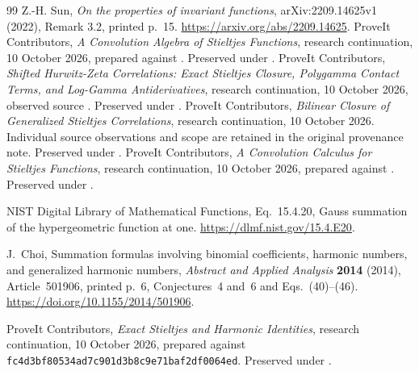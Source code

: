 \begin{thebibliography}{99}
Z.-H. Sun, \emph{On the properties of invariant functions},
arXiv:2209.14625v1 (2022), Remark 3.2, printed p.~15.
\url{https://arxiv.org/abs/2209.14625}.
ProveIt Contributors, \emph{A Convolution Algebra of Stieltjes Functions},
research continuation, 10 October 2026, prepared against .
Preserved under .
ProveIt Contributors, \emph{Shifted Hurwitz-Zeta Correlations:
Exact Stieltjes Closure, Polygamma Contact Terms, and Log-Gamma Antiderivatives},
research continuation, 10 October 2026, observed source .
Preserved under .
ProveIt Contributors, \emph{Bilinear Closure of Generalized Stieltjes Correlations},
research continuation, 10 October 2026. Individual source observations and
scope are retained in the original provenance note.
Preserved under .
ProveIt Contributors, \emph{A Convolution Calculus for Stieltjes Functions},
research continuation, 10 October 2026, prepared against .
Preserved under .

NIST Digital Library of Mathematical Functions, Eq.~15.4.20,
Gauss summation of the hypergeometric function at one.
\url{https://dlmf.nist.gov/15.4.E20}.

J.~Choi, Summation formulas involving binomial coefficients, harmonic
numbers, and generalized harmonic numbers, \emph{Abstract and Applied
Analysis} \textbf{2014} (2014), Article~501906, printed p.~6,
Conjectures~4 and~6 and Eqs.~(40)--(46).
\url{https://doi.org/10.1155/2014/501906}.

ProveIt Contributors, \emph{Exact Stieltjes and Harmonic Identities},
research continuation, 10 October 2026, prepared against
\nolinkurl{fc4d3bf80534ad7c901d3b8c9e71baf2df0064ed}.
Preserved under .



\end{thebibliography}
